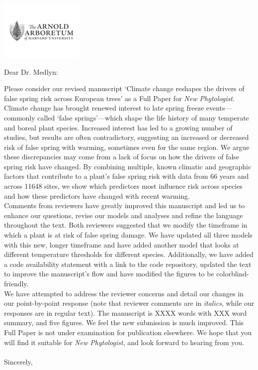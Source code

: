 \documentclass[11pt,a4paper]{letter}\usepackage[]{graphicx}\usepackage[]{color}
\begin{document}
\begin{letter}{}
\includegraphics[width=0.3\textwidth]{AA_logo.jpg}

\opening{Dear Dr. Medlyn:}

\noindent Please consider our revised manuscript `Climate change reshapes the drivers of false spring risk across European trees' as a Full Paper for \emph{New Phytologist.} 
\vspace{1.5ex}\\
Climate change has brought renewed interest to late spring freeze events---commonly called `false springs'---which shape the life history of many temperate and boreal plant species. Increased interest has led to a growing number of studies, but results are often contradictory, suggesting an increased or decreased risk of false spring with warming, sometimes even for the same region. We argue these discrepancies may come from a lack of focus on how the drivers of false spring risk have changed. By combining multiple, known climatic and geographic factors that contribute to a plant's false spring risk with data from 66 years and across 11648 sites, we show which predictors most influence risk across species and how these predictors have changed with recent warming.
\vspace{1.5ex}\\
Comments from reviewers have greatly improved this manuscript and led us to enhance our questions, revise our models and analyses and refine the language throughout the text. Both reviewers suggested that we modify the timeframe in which a plant is at risk of false spring damage. We have updated all three models with this new, longer timeframe and have added another model that looks at different temperature thresholds for different species.  Additionally, we have added a code availability statement with a link to the code repository, updated the text to improve the manuscript's flow and have modified the figures to be colorblind-friendly. 
\vspace{1.5ex}\\
We have attempted to address the reviewer concerns and detail our changes in our point-by-point response (note that reviewer comments are in \emph{italics}, while our responses are in regular text). The manuscript is XXXX words with XXX word summary, and five figures. We feel the new submission is much improved. This Full Paper is not under examination for publication elsewhere. We hope that you will find it suitable for \emph{New Phytologist}, and look forward to hearing from you.
\\\vspace{-1ex}\\
\noindent Sincerely,\\


\end{letter}
\end{document}
